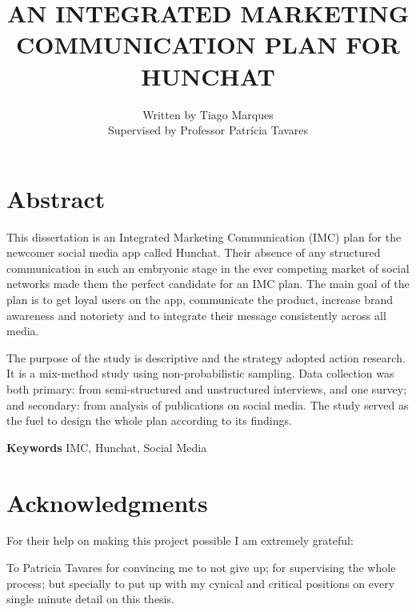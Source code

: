 \documentclass[12pt]{article}
\begin{document}
 

\begin{titlepage}
\title{AN INTEGRATED MARKETING COMMUNICATION PLAN FOR HUNCHAT}
\author{Written by Tiago Marques \\ Supervised by Professor Patrícia Tavares}
\date{}
\maketitle
\thispagestyle{empty}
\end{titlepage}


\section*{Abstract}\label{abst}
This dissertation is an Integrated Marketing Communication (IMC) plan for the newcomer social media app called Hunchat. Their absence of any structured communication in such an embryonic stage in the ever competing market of social networks made them the perfect candidate for an IMC plan. The main goal of the plan is to get loyal users on the app, communicate the product, increase brand awareness and notoriety and to integrate their message consistently across all media. 

The purpose of the study is descriptive and the strategy adopted action research. It is a mix-method study using non-probabilistic sampling. Data collection was both primary: from semi-structured and unstructured interviews, and one survey; and secondary: from analysis of publications on social media. The study served as the fuel to design the whole plan according to its findings.

  \par
 \textbf{Keywords} IMC, Hunchat, Social Media
\cleardoublepage

\section*{Acknowledgments}

For their help on making this project possible I am extremely grateful:

To Patricia Tavares for convincing me to not give up; for supervising the whole process; but specially to put up with my cynical and critical positions on every single minute detail on this thesis.
\end{document}
